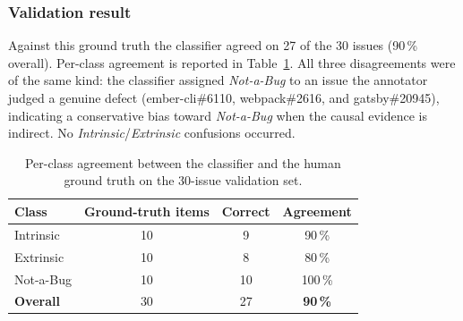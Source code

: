 \subsubsection{Validation result}

Against this ground truth the classifier agreed on 27 of the 30 issues
(90\,\% overall). Per-class agreement is reported in Table~\ref{tab:agreement}.
All three disagreements were of the same kind: the classifier assigned
\emph{Not-a-Bug} to an issue the annotator judged a genuine defect
(ember-cli\#6110, webpack\#2616, and gatsby\#20945), indicating a conservative
bias toward \emph{Not-a-Bug} when the causal evidence is indirect. No
\emph{Intrinsic}/\emph{Extrinsic} confusions occurred.

\begin{table}[t]
  \centering
  \caption{Per-class agreement between the classifier and the human ground
           truth on the 30-issue validation set.}
  \label{tab:agreement}
  \begin{tabular}{@{}lccc@{}}
    \toprule
    \textbf{Class} & \textbf{Ground-truth items} & \textbf{Correct} & \textbf{Agreement} \\
    \midrule
    Intrinsic  & 10 & 9  & 90\,\% \\
    Extrinsic  & 10 & 8  & 80\,\% \\
    Not-a-Bug  & 10 & 10 & 100\,\% \\
    \midrule
    \textbf{Overall} & 30 & 27 & \textbf{90\,\%} \\
    \bottomrule
  \end{tabular}
\end{table}

